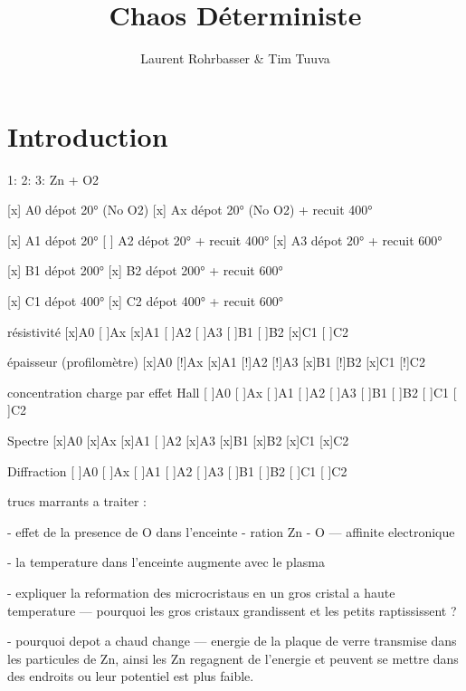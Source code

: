 \documentclass[a4paper,12pt,oneside]{article}
\begin{document}
\title{Chaos Déterministe}
\author{Laurent Rohrbasser \& Tim Tuuva}

\maketitle
\tableofcontents
\baselineskip=16pt
\parindent=15pt
\parskip=5pt

\begin{abstract}
\end{abstract}

\section{Introduction}




1:
2:
3: Zn + O2






[x] A0 dépot 20° (No O2)
[x] Ax dépot 20° (No O2) + recuit 400°

[x] A1 dépot 20°
[ ] A2 dépot 20° + recuit 400°
[x] A3 dépot 20° + recuit 600°

[x] B1 dépot 200°
[x] B2 dépot 200° + recuit 600°

[x] C1 dépot 400°
[x] C2 dépot 400° + recuit 600°



résistivité
[x]A0
[ ]Ax
[x]A1
[ ]A2
[ ]A3
[ ]B1
[ ]B2
[x]C1
[ ]C2

épaisseur (profilomètre)
[x]A0
[!]Ax
[x]A1
[!]A2
[!]A3
[x]B1
[!]B2
[x]C1
[!]C2

concentration charge par effet Hall
[ ]A0
[ ]Ax
[ ]A1
[ ]A2
[ ]A3
[ ]B1
[ ]B2
[ ]C1
[ ]C2

Spectre
[x]A0
[x]Ax
[x]A1
[ ]A2
[x]A3
[x]B1
[x]B2
[x]C1
[x]C2

Diffraction 
[ ]A0
[ ]Ax
[ ]A1
[ ]A2
[ ]A3
[ ]B1
[ ]B2
[ ]C1
[ ]C2


trucs marrants a traiter :

- effet de la presence de O dans l'enceinte
- ration Zn - O 
--- affinite electronique


- la temperature dans l'enceinte augmente avec le plasma

- expliquer la reformation des microcristaus en un gros cristal a haute temperature
--- pourquoi les gros cristaux grandissent et les petits raptississent ?

- pourquoi depot a chaud change
--- energie de la plaque de verre transmise dans les particules de Zn, ainsi les Zn regagnent de l'energie et peuvent se mettre dans des endroits ou leur potentiel est plus faible.
\end{document}
